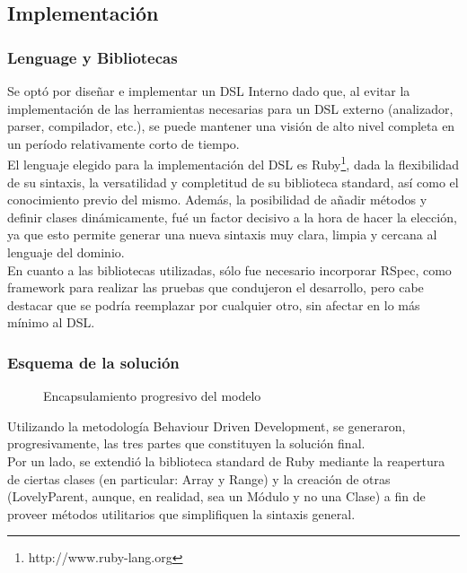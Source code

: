 \documentclass[10pt]{article}
\numberwithin{equation}{section}
\numberwithin{figure}{section}
\numberwithin{table}{section}
\begin{document}
\newpage
\subsection{Implementación}\label{implementacion}
\subsubsection{Lenguage y Bibliotecas}
Se optó por diseñar e implementar un DSL Interno dado que, al evitar la implementación de las herramientas necesarias para un DSL externo (analizador, parser, compilador, etc.), se puede mantener una visión de alto nivel completa en un período relativamente corto de tiempo.\\

El lenguaje elegido para la implementación del DSL es Ruby\footnote{http://www.ruby-lang.org}, dada la flexibilidad de su sintaxis, la versatilidad y completitud de su biblioteca standard, así como el conocimiento previo del mismo. Además, la posibilidad de añadir métodos y definir clases dinámicamente, fué un factor decisivo a la hora de hacer la elección, ya que esto permite generar una nueva sintaxis muy clara, limpia y cercana al lenguaje del dominio.\\

En cuanto a las bibliotecas utilizadas, sólo fue necesario incorporar RSpec, como framework para realizar las pruebas que condujeron el desarrollo, pero cabe destacar que se podría reemplazar por cualquier otro, sin afectar en lo más mínimo al DSL.

\subsubsection{Esquema de la solución}
\begin{figure}[!ht]
\centering
    
\caption{Encapsulamiento progresivo del modelo}
\end{figure}

Utilizando la metodología Behaviour Driven Development, se generaron, progresivamente, las tres partes que constituyen la solución final.\\

Por un lado, se extendió la biblioteca standard de Ruby mediante la reapertura de ciertas clases (en particular: Array y Range) y la creación de otras (LovelyParent, aunque, en realidad, sea un Módulo y no una Clase) a fin de proveer métodos utilitarios que simplifiquen la sintaxis general.\\
\end{document}
